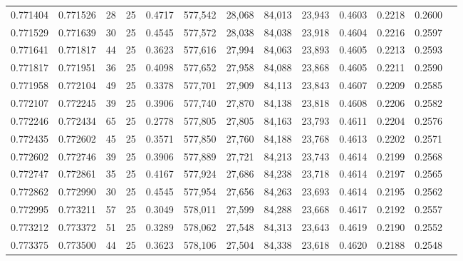 \begin{tabular}{rrrrrrrrrrrrr}
0.771404 & 0.771526 &    28 &  25 &                                     0.4717 & 577,542 &  28,068 &  84,013 &  23,943 & 0.4603 & 0.2218 & 0.2600 \\
0.771529 & 0.771639 &    30 &  25 &                                     0.4545 & 577,572 &  28,038 &  84,038 &  23,918 & 0.4604 & 0.2216 & 0.2597 \\
0.771641 & 0.771817 &    44 &  25 &                                     0.3623 & 577,616 &  27,994 &  84,063 &  23,893 & 0.4605 & 0.2213 & 0.2593 \\
0.771817 & 0.771951 &    36 &  25 &                                     0.4098 & 577,652 &  27,958 &  84,088 &  23,868 & 0.4605 & 0.2211 & 0.2590 \\
0.771958 & 0.772104 &    49 &  25 &                                     0.3378 & 577,701 &  27,909 &  84,113 &  23,843 & 0.4607 & 0.2209 & 0.2585 \\
0.772107 & 0.772245 &    39 &  25 &                                     0.3906 & 577,740 &  27,870 &  84,138 &  23,818 & 0.4608 & 0.2206 & 0.2582 \\
0.772246 & 0.772434 &    65 &  25 &                                     0.2778 & 577,805 &  27,805 &  84,163 &  23,793 & 0.4611 & 0.2204 & 0.2576 \\
0.772435 & 0.772602 &    45 &  25 &                                     0.3571 & 577,850 &  27,760 &  84,188 &  23,768 & 0.4613 & 0.2202 & 0.2571 \\
0.772602 & 0.772746 &    39 &  25 &                                     0.3906 & 577,889 &  27,721 &  84,213 &  23,743 & 0.4614 & 0.2199 & 0.2568 \\
0.772747 & 0.772861 &    35 &  25 &                                     0.4167 & 577,924 &  27,686 &  84,238 &  23,718 & 0.4614 & 0.2197 & 0.2565 \\
0.772862 & 0.772990 &    30 &  25 &                                     0.4545 & 577,954 &  27,656 &  84,263 &  23,693 & 0.4614 & 0.2195 & 0.2562 \\
0.772995 & 0.773211 &    57 &  25 &                                     0.3049 & 578,011 &  27,599 &  84,288 &  23,668 & 0.4617 & 0.2192 & 0.2557 \\
0.773212 & 0.773372 &    51 &  25 &                                     0.3289 & 578,062 &  27,548 &  84,313 &  23,643 & 0.4619 & 0.2190 & 0.2552 \\
0.773375 & 0.773500 &    44 &  25 &                                     0.3623 & 578,106 &  27,504 &  84,338 &  23,618 & 0.4620 & 0.2188 & 0.2548 \\

\end{tabular}
